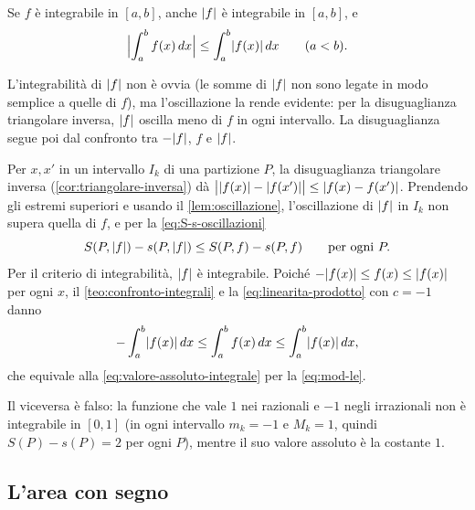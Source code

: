\begin{teorema}\label{teo:valore-assoluto}
Se $f$ è integrabile in $[a,b]$, anche $\lvert f\rvert$ è integrabile in $[a,b]$, e
\begin{equation}\label{eq:valore-assoluto-integrale}
  \Bigl|\int_{a}^{b}f(x)\,dx\Bigr|\le\int_{a}^{b}\lvert f(x)\rvert\,dx \qquad (a<b) .
\end{equation}
\end{teorema}

\begin{schema}
\end{schema}

\begin{strategia}
L'integrabilità di $\lvert f\rvert$ non è ovvia (le somme di $\lvert f\rvert$ non sono legate in modo
semplice a quelle di $f$), ma l'oscillazione la rende evidente: per la disuguaglianza
triangolare inversa, $\lvert f\rvert$ oscilla meno di $f$ in ogni intervallo. La disuguaglianza
segue poi dal confronto tra $-\lvert f\rvert$, $f$ e $\lvert f\rvert$.
\end{strategia}

\begin{dimostrazione}
Per $x,x'$ in un intervallo $I_{k}$ di una partizione $P$, la disuguaglianza
triangolare inversa (\cref{cor:triangolare-inversa}) dà
$\bigl|\lvert f(x)\rvert-\lvert f(x')\rvert\bigr|\le\lvert f(x)-f(x')\rvert$. Prendendo gli estremi superiori e
usando il \cref{lem:oscillazione}, l'oscillazione di $\lvert f\rvert$ in $I_{k}$ non supera
quella di $f$, e per la \eqref{eq:S-s-oscillazioni}
\[
  S(P,\lvert f\rvert)-s(P,\lvert f\rvert)\le S(P,f)-s(P,f) \qquad\text{per ogni } P .
\]
Per il criterio di integrabilità, $\lvert f\rvert$ è integrabile. Poiché
$-\lvert f(x)\rvert\le f(x)\le\lvert f(x)\rvert$ per ogni $x$, il \cref{teo:confronto-integrali} e la
\eqref{eq:linearita-prodotto} con $c=-1$ danno
\[
  -\int_{a}^{b}\lvert f(x)\rvert\,dx\le\int_{a}^{b}f(x)\,dx\le\int_{a}^{b}\lvert f(x)\rvert\,dx ,
\]
che equivale alla \eqref{eq:valore-assoluto-integrale} per la \eqref{eq:mod-le}.
\end{dimostrazione}

Il viceversa è falso: la funzione che vale $1$ nei razionali e $-1$ negli irrazionali
non è integrabile in $[0,1]$ (in ogni intervallo $m_{k}=-1$ e $M_{k}=1$, quindi
$S(P)-s(P)=2$ per ogni $P$), mentre il suo valore assoluto è la costante $1$.

\subsection{L'area con segno}

